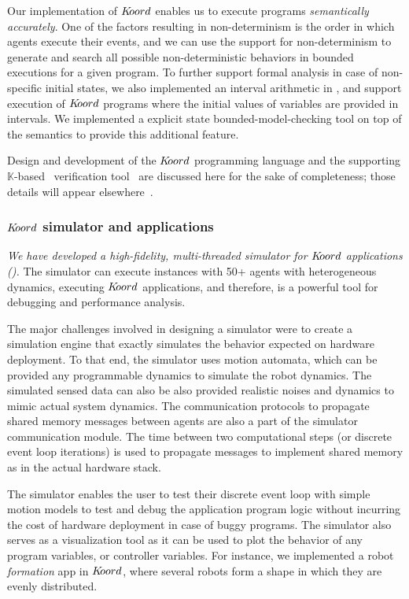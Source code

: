 Our \K implementation of $K\kern-2pt oord$ enables us to execute  programs \emph{semantically accurately}. One of the factors resulting in non-determinism is the order in which agents execute their events, and we can use the \K support for non-determinism to generate and search all possible non-deterministic behaviors in bounded executions for a given program. To further support formal analysis in case of non-specific initial states, we also implemented an interval arithmetic in \K, and support execution of $K\kern-2pt oord$ programs where the initial values of variables are provided in intervals. We implemented a explicit state bounded-model-checking  tool on top of the \K semantics to provide this additional feature. 


Design and development of the $K\kern-2pt oord$ programming language and the supporting $\mathbb{K}$-based~\cite{Kpaper} verification tool \kbmc\, are discussed here for the sake of completeness; those details will appear elsewhere~\cite{koordreport}.

\subsubsection{$K\kern-2pt oord$ simulator and applications}

{\em We have developed a high-fidelity, multi-threaded simulator for $K\kern-2pt oord$ applications (). } The simulator can execute instances with 50+ agents with heterogeneous dynamics, executing $K\kern-2pt oord$ applications, and therefore, is a powerful tool for debugging and performance analysis.  

The major challenges involved in designing a simulator were to create a simulation engine that exactly simulates the behavior expected on hardware deployment. 
To that end, the simulator uses motion automata, which can be provided any programmable dynamics to simulate the robot dynamics. The simulated sensed data can also be also provided realistic noises and dynamics to mimic actual system dynamics. The communication protocols to propagate shared memory messages between agents are also a part of the simulator communication module. The time between two computational steps (or discrete event loop iterations) is used to propagate messages to implement shared memory as in the actual hardware stack.

The simulator enables the user to test their discrete event loop with simple motion models to test and debug the application program logic without incurring the cost of hardware deployment in case of buggy programs. The simulator also serves as a visualization tool as it can be used to plot the behavior of any program variables, or controller variables. For instance, we implemented a robot \emph{formation} app in $K\kern-2pt oord$, where several robots form a shape in which they are evenly distributed.

